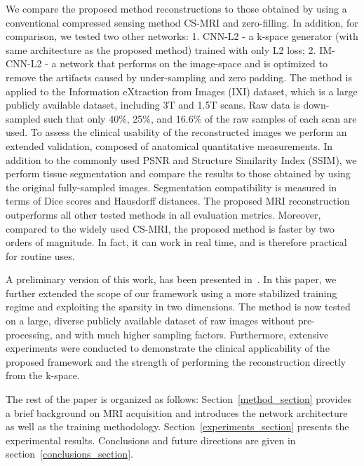\documentclass[10pt,journal,compsoc]{IEEEtran}
\begin{document}
We compare the proposed method reconstructions to those obtained by using a conventional compressed sensing method CS-MRI \cite{lustig2007sparse} and zero-filling. In addition, for comparison, we tested two other networks: 1. CNN-L2 - a k-space generator (with same architecture as the proposed method) trained with only L2 loss; 2. IM-CNN-L2 - a network that performs on the image-space and is optimized to remove the artifacts caused by under-sampling and zero padding.
The method is applied to the Information eXtraction from Images (IXI) dataset, which is a large publicly available dataset, including 3T and 1.5T scans. Raw data is down-sampled such that only 40\%, 25\%, and 16.6\% of the raw samples of each scan are used.
To assess the clinical usability of the reconstructed images we perform an extended validation, composed of anatomical quantitative measurements. In addition to the commonly used PSNR and Structure Similarity Index (SSIM), we perform tissue segmentation and compare the results to those obtained by using the original fully-sampled images. Segmentation compatibility is measured in terms of Dice scores and Hausdorff distances.
The proposed MRI reconstruction outperforms all other tested methods in all evaluation metrics. Moreover, compared to the widely used CS-MRI, the proposed method is faster by two orders of magnitude. In fact, it can work in real time, and is therefore practical for routine uses.

A preliminary version of this work, has been presented in~\cite{shitrit2017accelerated}. In this paper, we further extended the scope of our framework using a more stabilized training regime and exploiting the sparsity in two dimensions. The method is now tested on a large, diverse publicly available dataset of raw images without pre-processing, and with much higher sampling factors. Furthermore, extensive experiments were conducted to demonstrate the clinical applicability of the proposed framework and the strength of performing the reconstruction directly from the k-space.

The rest of the paper is organized as follows: Section~\ref{method_section} provides a brief background on MRI acquisition and introduces the network architecture as well as the training methodology. Section~\ref{experiments_section} presents the experimental results. Conclusions and future directions are given in section~\ref{conclusions_section}.
\end{document}
